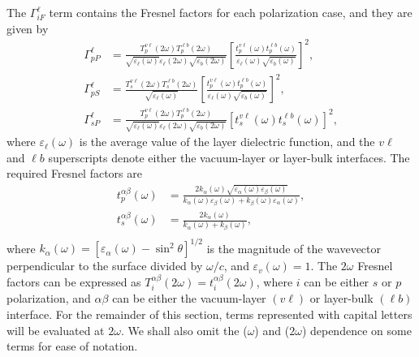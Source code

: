 \documentclass[prb,superscriptaddress,showpacs,twocolumn,letterpaper]{revtex4}
\begin{document}
The $\Gamma^{\ell}_{iF}$ term contains the Fresnel factors for each polarization
case, and they are given by
\begin{align*}
\Gamma^{\ell}_{pP} &=
\frac{T^{v\ell}_{p}(2\omega)T^{\ell b}_{p}(2\omega)}
     {\sqrt{\varepsilon_{\ell}(\omega)}\varepsilon_{\ell}({2\omega})
     \sqrt{\varepsilon_{b}(2\omega)}}
\left[\frac{t^{v\ell}_{p}(\omega)t^{\ell b}_{p}(\omega)}
{\varepsilon_{\ell}(\omega)\sqrt{\varepsilon_{b}(\omega)}}\right]^{2},\\
\Gamma^{\ell}_{pS} &=
\frac{T^{v\ell}_{s}(2\omega)T^{\ell b}_{s}(2\omega)}
     {\sqrt{\varepsilon_{\ell}(\omega)}}
\left[\frac{t^{v\ell}_{p}(\omega)t^{\ell b}_{p}(\omega)}
      {\varepsilon_{\ell}(\omega)\sqrt{\varepsilon_{b}(\omega)}}\right]^{2},\\
\Gamma^{\ell}_{sP} &=
\frac{T_{p}^{v\ell}(2\omega)T^{\ell b}_{p}(2\omega)}
    {\sqrt{\varepsilon_{\ell}(\omega)}\varepsilon_{\ell}(2\omega)
    \sqrt{\varepsilon_{b}(2\omega)}}
\left[t_s^{v\ell}(\omega)t^{\ell b}_s(\omega)\right]^2,
\end{align*}
where $\varepsilon_{\ell}(\omega)$ is the average value of the layer dielectric
function, and the $v\ell$ and $\ell b$ superscripts denote either the
vacuum-layer or layer-bulk interfaces. The required Fresnel factors
are\cite{mizrahiJOSA88}
\begin{align*}
t_{p}^{\alpha\beta}(\omega) &=
\frac{2k_{\alpha}(\omega)
\sqrt{\varepsilon_{\alpha}(\omega)\varepsilon_{\beta}(\omega)}}
{k_{\alpha}(\omega)\varepsilon_{\beta}(\omega)+
k_{\beta}(\omega)\varepsilon_{\alpha}(\omega)},\\
t_s^{\alpha\beta}(\omega) &=
\frac{2k_{\alpha}(\omega)}{k_{\alpha}(\omega)+k_{\beta}(\omega)},\\
\end{align*}
where $k_{\alpha}(\omega) = [\varepsilon_{\alpha}(\omega)-\sin^2\theta]^{1/2}$
is the magnitude of the wavevector perpendicular to the surface divided by
$\omega/c$, and $\varepsilon_{v}(\omega) = 1$. The $2\omega$ Fresnel factors can
be expressed as $T^{\alpha\beta}_{i}(2\omega) = t^{\alpha\beta}_{i}(2\omega)$,
where $i$ can be either $s$ or $p$ polarization, and $\alpha\beta$ can be either
the vacuum-layer $(v\ell)$ or layer-bulk $(\ell b)$ interface. For the remainder
of this section, terms represented with capital letters will be evaluated at
$2\omega$. We shall also omit the ($\omega$) and ($2\omega$) dependence on some
terms for ease of notation.
\end{document}
